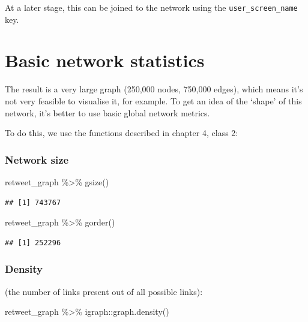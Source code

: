 \documentclass[
]{book}
\newenvironment{Shaded}{\begin{snugshade}}{\end{snugshade}}
\newcommand{\FunctionTok}[1]{\textcolor[rgb]{0.00,0.00,0.00}{#1}}
\newcommand{\NormalTok}[1]{#1}
\newcommand{\SpecialCharTok}[1]{\textcolor[rgb]{0.00,0.00,0.00}{#1}}
\begin{document}
At a later stage, this can be joined to the network using the \texttt{user\_screen\_name} key.

\hypertarget{basic-network-statistics}{%
\section{Basic network statistics}\label{basic-network-statistics}}

The result is a very large graph (250,000 nodes, 750,000 edges), which means it's not very feasible to visualise it, for example. To get an idea of the `shape' of this network, it's better to use basic global network metrics.

To do this, we use the functions described in chapter 4, class 2:

\hypertarget{network-size}{%
\subsubsection{Network size}\label{network-size}}

\begin{Shaded}
\begin{Highlighting}[]
\NormalTok{retweet\_graph }\SpecialCharTok{\%\textgreater{}\%} \FunctionTok{gsize}\NormalTok{()}
\end{Highlighting}
\end{Shaded}

\begin{verbatim}
## [1] 743767
\end{verbatim}

\begin{Shaded}
\begin{Highlighting}[]
\NormalTok{retweet\_graph }\SpecialCharTok{\%\textgreater{}\%} \FunctionTok{gorder}\NormalTok{()}
\end{Highlighting}
\end{Shaded}

\begin{verbatim}
## [1] 252296
\end{verbatim}

\hypertarget{density-2}{%
\subsubsection{Density}\label{density-2}}

(the number of links present out of all possible links):

\begin{Shaded}
\begin{Highlighting}[]
\NormalTok{retweet\_graph }\SpecialCharTok{\%\textgreater{}\%}\NormalTok{ igraph}\SpecialCharTok{::}\FunctionTok{graph.density}\NormalTok{()}
\end{Highlighting}
\end{Shaded}
\end{document}
